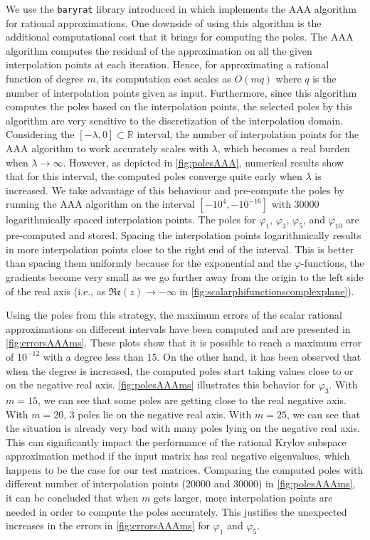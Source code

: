 We use the \texttt{baryrat} library introduced in \cite{hofreither2021BRASIL} which implements
the AAA algorithm for rational approximations. One downside of using this algorithm
is the additional computational cost that it brings for computing the poles.
The AAA algorithm  computes the residual of the approximation on all the given interpolation points at
each iteration. Hence, for approximating a rational function of degree $m$, its computation cost scales
as $O(mq)$ where $q$ is the number of interpolation points given as input.
Furthermore, since this algorithm computes the poles based on the interpolation points, the
selected poles by this algorithm are very sensitive to the discretization of the interpolation domain.
Considering the $[-\lambda, 0] \subset \mathbb{R}$ interval, the number of interpolation
points for the AAA algorithm to work accurately scales with $\lambda$, which becomes a real burden
when $\lambda \to \infty$. However, as depicted in \autoref{fig:polesAAA}, numerical results show that
for this interval, the computed poles converge quite early when $\lambda$ is increased. We take
advantage of this behaviour and pre-compute the poles by running the AAA algorithm
on the interval $[-10^{4}, -10^{-16}]$ with $30000$ logarithmically spaced interpolation points.
The poles for $\varphi_1$, $\varphi_3$, $\varphi_5$, and $\varphi_{10}$ are pre-computed and stored.
Spacing the interpolation points logarithmically results in more interpolation points close to
the right end of the interval. This is better than spacing them uniformly because for the
exponential and the $\varphi$-functions, the gradients become very small as we go further away
from the origin to the left side of the real axis (i.e.,
as $\mathfrak{Re}(z) \to -\infty$ in \autoref{fig:scalarphifunctionscomplexplane}).

Using the poles from this strategy, the maximum errors of the scalar rational approximations on different
intervals have been computed and are presented in \autoref{fig:errorsAAAms}. These plots show that
it is possible to reach a maximum error of $10^{-12}$ with a degree less than $15$.
On the other hand, it has been observed that when the degree is increased, the computed poles
start taking values close to or on the negative real axis.
\autoref{fig:polesAAAms} illustrates this behavior for $\varphi_3$.
With $m=15$, we can see that some poles are getting close to the real negative axis. With $m=20$, 3 poles
lie on the negative real axis. With $m=25$, we can see that the situation is already very bad with many
poles lying on the negative real axis.
This can significantly impact the performance of the rational Krylov subspace approximation method if the input
matrix has real negative eigenvalues, which happens to be the case for our test matrices.
Comparing the computed poles with different number of interpolation points ($20000$ and $30000$)
in \autoref{fig:polesAAAms}, it can be concluded that when $m$ gets larger, more interpolation
points are needed in order to compute the poles accurately.
This justifies the unexpected increases in the errors in \autoref{fig:errorsAAAms}
for $\varphi_1$ and $\varphi_5$.

